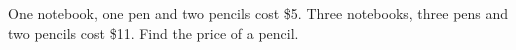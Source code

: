 One notebook, one pen and two pencils cost \$5. Three notebooks, three pens and two pencils cost \$11. Find the price of a pencil.
